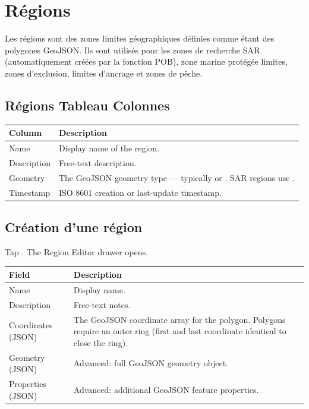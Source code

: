 \chapter{Régions}
\label{ch:regions}

Les régions sont des zones limites géographiques définies comme étant des polygones GeoJSON.
Ils sont utilisés pour les zones de recherche SAR (automatiquement créées par la fonction POB), zone marine protégée
limites, zones d'exclusion, limites d'ancrage et zones de pêche.


\section{Régions Tableau Colonnes}

\begin{longtable}{L{2.4cm} L{11.3cm}}
\toprule
{}
{\sffamily\bfseries\color{white} Column} &
{\sffamily\bfseries\color{white} Description} \\
\midrule
Name & Display name of the region. \\
Description & Free-text description. \\
Geometry & The GeoJSON geometry type --- typically  or . SAR regions use . \\
Timestamp & ISO 8601 creation or last-update timestamp. \\
\bottomrule
\end{longtable}

\section{Création d'une région}

Tap . The Region Editor drawer opens.

\begin{longtable}{L{3cm} L{10.7cm}}
\toprule
{}
{\sffamily\bfseries\color{white} Field} &
{\sffamily\bfseries\color{white} Description} \\
\midrule
Name & Display name. \\
Description & Free-text notes. \\
Coordinates (JSON) & The GeoJSON coordinate array for the polygon. Polygons require an outer ring (first and last coordinate identical to close the ring). \\
Geometry (JSON) & Advanced: full GeoJSON geometry object. \\
Properties (JSON) & Advanced: additional GeoJSON feature properties. \\
\bottomrule
\end{longtable}

